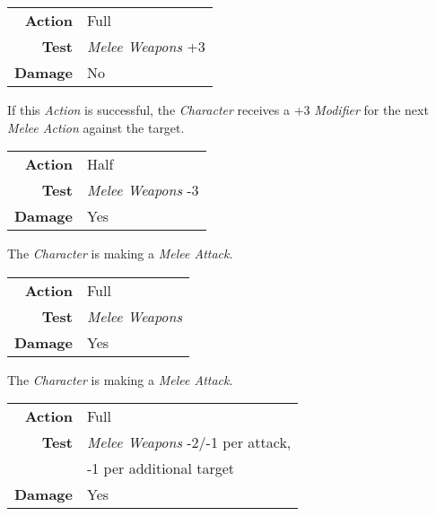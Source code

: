 
\begin{tabular}{rl}
    \textbf{Action} & Full                    \\
    \textbf{Test}   & \emph{Melee Weapons} +3 \\
    \textbf{Damage} & No                      \\
\end{tabular}

\hfill

If this \emph{Action} is successful, the \emph{Character} receives a +3
\emph{Modifier} for the next \emph{Melee Action} against the target.


\begin{tabular}{rl}
    \textbf{Action} & Half                    \\
    \textbf{Test}   & \emph{Melee Weapons} -3 \\
    \textbf{Damage} & Yes                     \\
\end{tabular}

\hfill

The \emph{Character} is making a \emph{Melee Attack}.


\begin{tabular}{rl}
    \textbf{Action} & Full                 \\
    \textbf{Test}   & \emph{Melee Weapons} \\
    \textbf{Damage} & Yes                  \\
\end{tabular}

\hfill

The \emph{Character} is making a \emph{Melee Attack}.


\begin{tabular}{rl}
    \textbf{Action} & Full                                   \\
    \textbf{Test}   & \emph{Melee Weapons} -2/-1 per attack, \\
                    & -1 per additional target               \\
    \textbf{Damage} & Yes                                    \\
\end{tabular}

